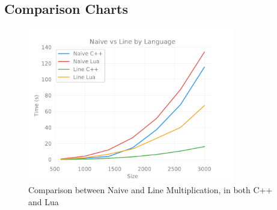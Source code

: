 \subsection{Comparison Charts}

    \begin{figure}[h]
        \centering
        \captionsetup{justification=centering, margin=2cm}
        \includegraphics[width=0.8\textwidth]{pdf/naive-line}
        \caption{Comparison between Naive and Line Multiplication, in both C++ and Lua}
        \label{fig:chart:naive-line}
    \end{figure}